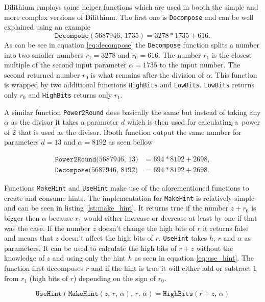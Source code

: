 Dilithium employs some helper functions which are used in booth the simple and more complex versions of Dilithium. The first one is \texttt{Decompose} and can be well explained using an example
\begin{equation}
  \label{eq:decompose}
  \mathrm{\texttt{Decompose}}(5687946,\,1735)=3278*1735+616.
\end{equation}
\noindent As can be see in equation \ref{eq:decompose} the \texttt{Decompose} function splits a number into two smaller numbers $r_1=3278$ and $r_0=616$. The number $r_1$ is the closest multiple of the second input parameter $\alpha=1735$ to the input number. The second returned number $r_0$ is what remains after the division of $\alpha$. This function is wrapped by two additional functions \texttt{HighBits} and \texttt{LowBits}. \texttt{LowBits} returns only $r_0$ and \texttt{HighBits} returns only $r_1$.

A similar function \texttt{Power2Round} does basically the same but instead of taking any $\alpha$ as the divisor it takes a parameter $d$ which is then used for calculating a~power of 2 that is used as the divisor. Booth function output the same number for parameters $d=13$ and $\alpha=8192$ as seen bellow

\begin{align}
  \mathrm{\texttt{Power2Round}}(5687946,\,13\mathrm)&=694*8192+2698, \\
  \mathrm{\texttt{Decompose}}(5687946,\,8192\mathrm)&=694*8192+2698.
\end{align}

Functions \texttt{MakeHint} and \texttt{UseHint} make use of the aforementioned functions to create and consume hints. The implementation for \texttt{MakeHint} is relatively simple and can be seen in listing \ref{lst:make_hint}. It returns true if the number $z+r_0$ is bigger then $\alpha$ because $r_1$ would either increase or decrease at least by one if that was the case. If the number $z$ doesn't change the high bits of $r$ it returns false and means that $z$ doesn't affect the high bits of $r$.
\noindent\texttt{UseHint} takes $h$, $r$ and $\alpha$ as parameters. It can be used to calculate the high bits of $r+z$ without the knowledge of $z$ and using only the hint $h$ as seen in equation \ref{eq:use_hint}. The function first decomposes $r$ and if the hint is true it will either add or subtract 1 from $r_1$ (high bits of $r$) depending on the sign of $r_0$.

\begin{equation}
  \label{eq:use_hint}
  \mathrm{\texttt{UseHint}}(\mathrm{\texttt{MakeHint}}(z,\,r,\,\alpha),\,r,\,\alpha)=\mathrm{\texttt{HighBits}}(r+z,\,\alpha)
\end{equation}